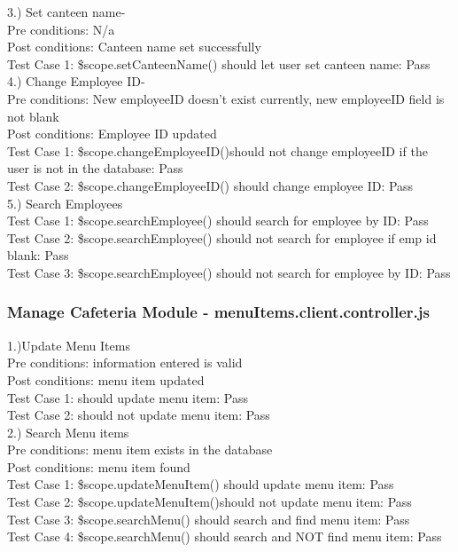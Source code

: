 \documentclass[a4paper,12pt]{report}
\begin{document}
3.) Set canteen name-\\
Pre conditions: N/a \\
Post conditions: Canteen name set successfully \\
Test Case 1: \$scope.setCanteenName()  should let user set canteen name: Pass \\

4.) Change Employee ID- \\
Pre conditions: New employeeID doesn't exist currently, new employeeID field is not blank \\
Post conditions: Employee ID updated \\
Test Case 1: \$scope.changeEmployeeID()should not change employeeID if the user is not in the database: Pass \\
Test Case 2: \$scope.changeEmployeeID() should change employee ID: Pass \\

5.) Search Employees \\
Test Case 1: \$scope.searchEmployee() should search for employee by ID: Pass \\
Test Case 2:  \$scope.searchEmployee() should not search for employee if emp id blank: Pass \\
Test Case 3: \$scope.searchEmployee() should not search for employee by ID: Pass \\

\subsubsection{Manage Cafeteria Module - menuItems.client.controller.js }
1.)Update Menu Items \\
Pre conditions: information entered is valid\\
Post conditions: menu item updated\\
Test Case 1: should update menu item: Pass \\
Test Case 2: should not update menu item: Pass \\

2.) Search Menu items \\
Pre conditions: menu item exists in the database \\
Post conditions: menu item found \\
Test Case 1: \$scope.updateMenuItem() should update menu item: Pass \\
Test Case 2: \$scope.updateMenuItem()should not update menu item: Pass \\
Test Case 3: \$scope.searchMenu() should search and find menu item: Pass \\
Test Case 4: \$scope.searchMenu() should search and NOT find menu item: Pass \\
\end{document}
